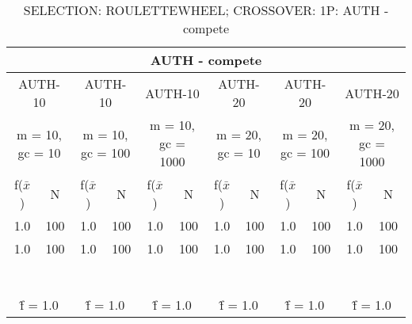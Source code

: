 \begin{table}[H]
	\centering
	\caption{SELECTION: ROULETTEWHEEL; CROSSOVER: 1P: AUTH - compete}
	\begin{adjustbox}{width=1\textwidth}
		\begin{tabular}{ |c|c||c|c||c|c||c|c||c|c||c|c| }
			\hline
			\multicolumn{12}{|c|}{AUTH - compete} \\
			\hline
			\multicolumn{2}{|c||}{AUTH-10} & \multicolumn{2}{c||}{AUTH-10} & \multicolumn{2}{c||}{AUTH-10} & \multicolumn{2}{c||}{AUTH-20} & \multicolumn{2}{c||}{AUTH-20} & \multicolumn{2}{c|}{AUTH-20}\\
			\hline
			\multicolumn{2}{|c||}{m = 10, gc = 10} & \multicolumn{2}{c||}{m = 10, gc = 100} & \multicolumn{2}{c||}{m = 10, gc = 1000} & \multicolumn{2}{c||}{m = 20, gc = 10} & \multicolumn{2}{c||}{m = 20, gc = 100} & \multicolumn{2}{c|}{m = 20, gc = 1000}\\
			\hline
			f($\bar{x}$) & N & f($\bar{x}$) & N & f($\bar{x}$) & N & f($\bar{x}$) & N & f($\bar{x}$) & N & f($\bar{x}$) & N\\
			\hline
			\hline
			1.0 & 100 & 1.0 & 100 & 1.0 & 100 & 1.0 & 100 & 1.0 & 100 & 1.0 & 100\\
			\hline
			1.0 & 100 & 1.0 & 100 & 1.0 & 100 & 1.0 & 100 & 1.0 & 100 & 1.0 & 100\\
			&   &   &   &   &   &   &   &   &   &   &  \\
			&   &   &   &   &   &   &   &   &   &   &  \\
			&   &   &   &   &   &   &   &   &   &   &  \\
			&   &   &   &   &   &   &   &   &   &   &  \\
			&   &   &   &   &   &   &   &   &   &   &  \\
			&   &   &   &   &   &   &   &   &   &   &  \\
			&   &   &   &   &   &   &   &   &   &   &  \\
			\hline
			\multicolumn{2}{|c||}{\^{f} = 1.0} & \multicolumn{2}{c||}{\^{f} = 1.0} & \multicolumn{2}{c||}{\^{f} = 1.0} & \multicolumn{2}{c||}{\^{f} = 1.0} & \multicolumn{2}{c||}{\^{f} = 1.0} & \multicolumn{2}{c|}{\^{f} = 1.0}\\
			\hline
		\end{tabular}
	\end{adjustbox}
\end{table}
